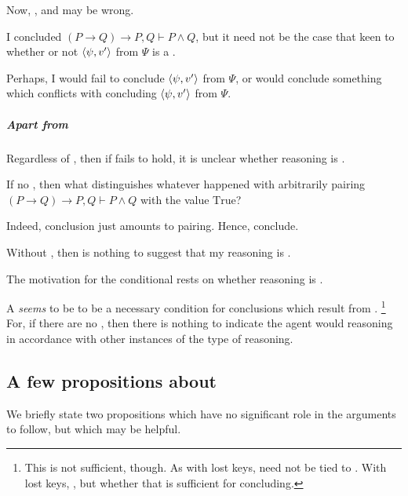 \begin{note}
  Now, , and  may be wrong.

  I concluded \((P \rightarrow Q) \rightarrow P, Q \vdash P \land Q\), but it need not be the case that {\color{blue} keen} to whether or not \(\langle \psi, v' \rangle\) from \(\Psi\) is a \fc{}.

  Perhaps, I would fail to conclude \(\langle \psi, v' \rangle\) from \(\Psi\), or would conclude something which conflicts with concluding \(\langle \psi, v' \rangle\) from \(\Psi\).
\end{note}

\subparagraph{Apart from }

\begin{note}
  Regardless of , then if \requ{} fails to hold, it is unclear whether reasoning is \tR{}.

  If no \requ{}, then what distinguishes whatever happened with arbitrarily pairing \((P \rightarrow Q) \rightarrow P, Q \vdash P \land Q\) with the value \(\text{True}\)?

  Indeed, conclusion just amounts to pairing.
  Hence, conclude.

  Without , then is nothing to suggest that my reasoning is \tR{}.
\end{note}

\begin{note}
  The motivation for the conditional rests on whether reasoning is \tR{}.

  A \requ{} \emph{seems} to be to be a necessary condition for conclusions which result from \tR{}.%
  \footnote{
    This is not sufficient, though.
    As with lost keys, \requ{} need not be tied to \tR{}.
    With lost keys, \tR{}, but whether that is sufficient for concluding.
  }
  For, if there are no , then there is nothing to indicate the agent would reasoning in accordance with other instances of the type of reasoning.
\end{note}

\subsection{A few propositions about }
\label{sec:propsoitions}

\begin{note}
  We briefly state two propositions which have no significant role in the arguments to follow, but which may be helpful.
\end{note}

